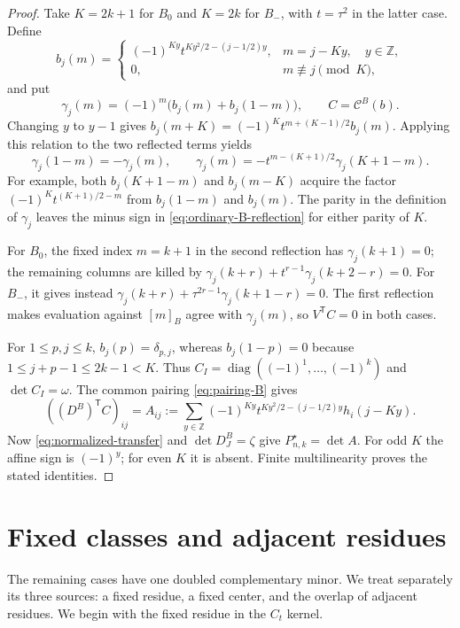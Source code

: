 \documentclass[12pt]{article}
\numberwithin{equation}{section}
\newcommand{\Z}{\mathbb Z}
\newcommand{\diag}{\operatorname{diag}}
\begin{document}
\begin{proof}
Take $K=2k+1$ for $B_0$ and $K=2k$ for $B_-$, with $t=\tau^2$
in the latter case.  Define
\[
 b_j(m)=
 \begin{cases}
 (-1)^{Ky}t^{Ky^2/2-(j-1/2)y},&m=j-Ky,\quad y\in\Z,\\
 0,&m\not\equiv j\pmod K,
 \end{cases}
\]
and put
\[
 \gamma_j(m)=(-1)^m\bigl(b_j(m)+b_j(1-m)\bigr),
 \qquad C=\mathcal C^B(b).
\]
Changing $y$ to $y-1$ gives
$b_j(m+K)=(-1)^K t^{m+(K-1)/2}b_j(m)$.
Applying this relation to the two reflected terms yields
\begin{equation}\label{eq:ordinary-B-reflection}
 \gamma_j(1-m)=-\gamma_j(m),\qquad
 \gamma_j(m)=-t^{m-(K+1)/2}\gamma_j(K+1-m).
\end{equation}
For example, both $b_j(K+1-m)$ and $b_j(m-K)$ acquire the factor
$(-1)^K t^{(K+1)/2-m}$ from $b_j(1-m)$ and $b_j(m)$.
The parity in the definition of $\gamma_j$ leaves the minus sign
in \eqref{eq:ordinary-B-reflection} for either parity of $K$.

For $B_0$, the fixed index $m=k+1$ in the second reflection has
$\gamma_j(k+1)=0$; the remaining columns are killed by
$\gamma_j(k+r)+t^{r-1}\gamma_j(k+2-r)=0$.
For $B_-$, it gives instead
$\gamma_j(k+r)+\tau^{2r-1}\gamma_j(k+1-r)=0$.
The first reflection makes evaluation against $[m]_B$ agree with
$\gamma_j(m)$, so $V^{\mathsf T}C=0$ in both cases.

For $1\le p,j\le k$, $b_j(p)=\delta_{p,j}$, whereas
$b_j(1-p)=0$ because $1\le j+p-1\le2k-1<K$.
Thus $C_I=\diag((-1)^1,\ldots,(-1)^k)$ and $\det C_I=\omega$.
The common pairing \eqref{eq:pairing-B} gives
\[
 ((D^B)^{\mathsf T}C)_{ij}
 =A_{ij}:=\sum_{y\in\Z}
 (-1)^{Ky}t^{Ky^2/2-(j-1/2)y}h_i(j-Ky).
\]
Now \eqref{eq:normalized-transfer} and $\det D^B_J=\zeta$ give
$P^\star_{n,k}=\det A$.  For odd $K$ the affine sign is $(-1)^y$;
for even $K$ it is absent.  Finite multilinearity proves the stated
identities.
\end{proof}


\section{Fixed classes and adjacent residues}\label{sec:exceptional}

The remaining cases have one doubled complementary minor.  We treat
separately its three sources: a fixed residue, a fixed center, and the
overlap of adjacent residues.
We begin with the fixed residue in the $C_t$ kernel.
\end{document}
